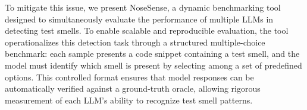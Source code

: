 \documentclass[sigconf]{acmart}
\begin{document}

To mitigate this issue, we present NoseSense, a dynamic benchmarking tool designed to simultaneously evaluate the performance of multiple LLMs in detecting test smells. To enable scalable and reproducible evaluation, the tool operationalizes this detection task through a structured multiple-choice benchmark: each sample presents a code snippet containing a test smell, and the model must identify which smell is present by selecting among a set of predefined options. This controlled format ensures that model responses can be automatically verified against a ground-truth oracle, allowing rigorous measurement of each LLM's ability to recognize test smell patterns. 
\end{document}
